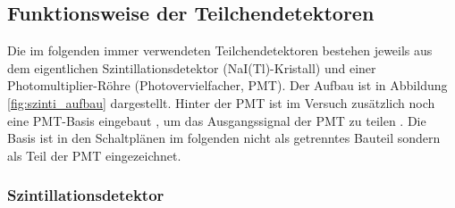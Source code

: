 \subsection{Funktionsweise der Teilchendetektoren}

Die im folgenden immer verwendeten Teilchendetektoren bestehen jeweils aus dem eigentlichen Szintillationsdetektor (NaI(Tl)-Kristall) und einer Photomultiplier-Röhre (Photovervielfacher, PMT). Der Aufbau ist in Abbildung \ref{fig:szinti_aufbau} dargestellt. Hinter der PMT ist im Versuch zusätzlich noch eine PMT-Basis eingebaut \cite[Abbildung P525.1]{525va}, um das Ausgangssignal der PMT zu teilen \cite{pmtbasis}. Die Basis ist in den Schaltplänen im folgenden nicht als getrenntes Bauteil sondern als Teil der PMT eingezeichnet.



\subsubsection{Szintillationsdetektor} \label{sec:szintiaufbau}

